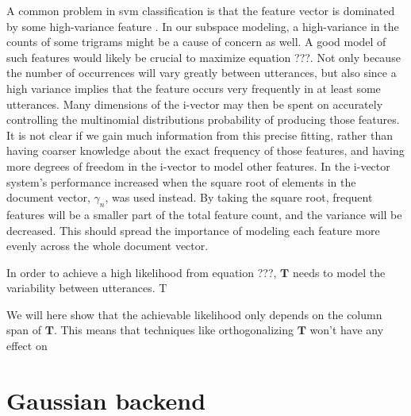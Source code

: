 A common problem in svm classification is that the feature vector is dominated by some high-variance feature \cite{wan2005speaker}. In our subspace modeling, a high-variance in the counts of some trigrams might be a cause of concern as well. A good model of such features would likely be crucial to maximize equation ???. Not only because the number of occurrences will vary greatly between utterances, but also since a high variance implies that the feature occurs very frequently in at least some utterances. Many dimensions of the i-vector may then be spent on accurately controlling the multinomial distributions probability of producing those features. It is not clear if we gain much information from this precise fitting, rather than having coarser knowledge about the exact frequency of those features, and having more degrees of freedom in the i-vector to model other features. In \cite{soufifar2011ivector} the i-vector system's performance increased when the square root of elements in the document vector, $\gamma_n$, was used instead. By taking the square root, frequent features will be a smaller part of the total feature count, and the variance will be decreased. This should spread the importance of modeling each feature more evenly across the whole document vector.



In order to achieve a high likelihood from equation ???, $\mathbf{T}$ needs to model the variability between utterances. T

We will here show that the achievable likelihood only depends on the column span of $\mathbf{T}$. This means that techniques like orthogonalizing $\mathbf{T}$ won't have any effect on 




\section{Gaussian backend}


